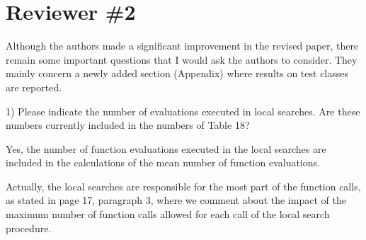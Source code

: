 
\section*{Reviewer \#2}

\begin{revAns}{Although the authors made a significant improvement in the revised paper, there remain some important questions that I would ask the authors to consider. They mainly concern a newly added section (Appendix) where results on test classes are reported.

1) Please indicate the number of evaluations executed in local searches. Are these numbers currently included in the numbers of Table 18?}

Yes, the number of function evaluations executed in the local searches are included in the calculations of the mean number of function evaluations. 

Actually, the local searches are responsible for the most part of the function calls, as stated in page 17, paragraph 3, where we comment about the impact of the maximum number of function calls allowed for each call of the local search procedure.

\end{revAns}


